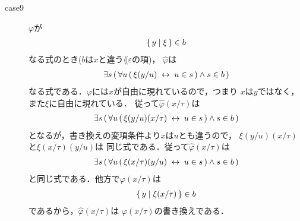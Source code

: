 \begin{metaprf}[第一]
\begin{description}
\begin{description}
					\item[case9] $\varphi$が
						\begin{align}
							\{\, y \mid \xi\, \} \in b
						\end{align}
						なる式のとき($b$は$x$と違う$\lang{\varepsilon}$の項)，
						$\widehat{\varphi}$は
						\begin{align}
							\exists s\, (\, \forall u\, (\, \xi(y/u) \hspace{0.25em}\leftrightarrow\hspace{0.25em} u \in s\, ) \wedge s \in b\, )
						\end{align}
						なる式である．$\varphi$には$x$が自由に現れているので，つまり
						$x$は$y$ではなく，また$\xi$に自由に現れている．
						従って$\widehat{\varphi}(x/\tau)$は
						\begin{align}
							\exists s\, (\, \forall u\, (\, \xi(y/u)(x/\tau) \hspace{0.25em}\leftrightarrow\hspace{0.25em} u \in s\, ) \wedge s \in b\, )
						\end{align}
						となるが，書き換えの変項条件より$x$は$u$とも違うので，
						$\xi(y/u)(x/\tau)$と$\xi(x/\tau)(y/u)$は
						同じ式である．従って$\widehat{\varphi}(x/\tau)$は
						\begin{align}
							\exists s\, (\, \forall u\, (\, \xi(x/\tau)(y/u) \hspace{0.25em}\leftrightarrow\hspace{0.25em} u \in s\, ) \wedge s \in b\, )
						\end{align}
						と同じ式である．他方で$\varphi(x/\tau)$は
						\begin{align}
							\{\, y \mid \xi(x/\tau)\, \} \in b
						\end{align}
						であるから，$\widehat{\varphi}(x/\tau)$は
						$\varphi(x/\tau)$の書き換えである．
						

\end{description}
\end{description}
\end{metaprf}
